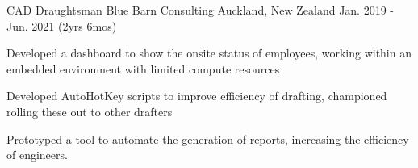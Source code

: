 \begin{cventries}
  \cventry
    {CAD Draughtsman} %
    {Blue Barn Consulting} %
    {Auckland, New Zealand} %
    {Jan. 2019 - Jun. 2021 (2yrs 6mos)} %
    {
      \begin{cvitems} %
        \item {Developed a dashboard to show the onsite status of employees, working within an embedded environment with limited compute resources}
        \item {Developed AutoHotKey scripts to improve efficiency of drafting, championed rolling these out to other drafters}
        \item {Prototyped a tool to automate the generation of reports, increasing the efficiency of engineers.}
      \end{cvitems}
    }


\end{cventries}
